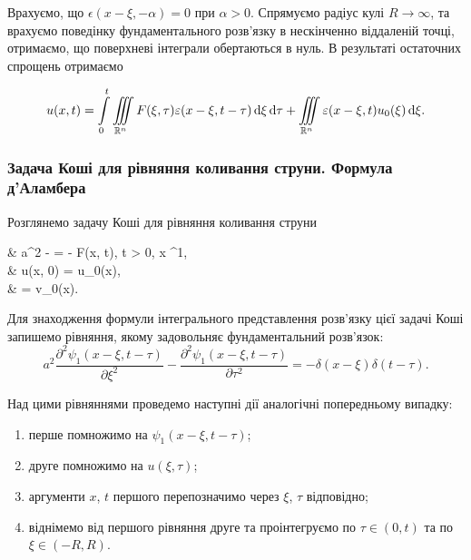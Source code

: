 
Врахуємо, що $\epsilon(x - \xi, - \alpha) = 0$ при $\alpha > 0$. Спрямуємо радіус кулі $R \to \infty$, та врахуємо поведінку фундаментального розв'язку в нескінченно віддаленій точці, отримаємо, що поверхневі інтеграли обертаються в нуль. В результаті остаточних спрощень отримаємо 
\begin{th_formula}
	\begin{equation}
		u(x, t) = \displaystyle\int\limits_0^t \displaystyle\iiint\limits_{\mathbb{R}^n} F(\xi, \tau) \varepsilon(x - \xi, t - \tau) \mathop{}\!\mathrm{d} \xi \mathop{}\!\mathrm{d} \tau + \displaystyle\iiint\limits_{\mathbb{R}^n} \varepsilon(x - \xi, t) u_0(\xi) \mathop{}\!\mathrm{d} \xi.
	\end{equation}
\end{th_formula}

\subsubsection{Задача Коші для рівняння коливання струни. Формула д'Аламбера}

\begin{example}
	Розглянемо задачу Коші для рівняння коливання струни
	\begin{system}
		& a^2  -  = - F(x, t), \quad t > 0, \quad x \in \RR^1, \\
		& u(x, 0) = u_0(x), \\
		&  = v_0(x).
	\end{system}
\end{example}

Для знаходження формули інтегрального представлення розв'язку цієї задачі Коші запишемо рівняння, якому задовольняє фундаментальний розв'язок:
\begin{equation}
	a^2 \frac{\partial^2 \psi_1(x - \xi, t - \tau)}{\partial \xi^2} - \frac{\partial^2 \psi_1(x - \xi, t - \tau)}{\partial \tau^2} = -\delta(x - \xi) \delta(t - \tau).
\end{equation}

Над цими рівняннями проведемо наступні дії аналогічні попередньому випадку:
\begin{enumerate}
	\item перше помножимо на $\psi_1(x - \xi, t - \tau)$;
	\item друге помножимо на $u(\xi, \tau)$;
	\item аргументи $x$, $t$ першого перепозначимо через $\xi$, $\tau$ відповідно;
	\item віднімемо від першого рівняння друге та проінтегруємо по $\tau \in (0, t)$ та по $\xi \in (-R, R)$.
\end{enumerate}

